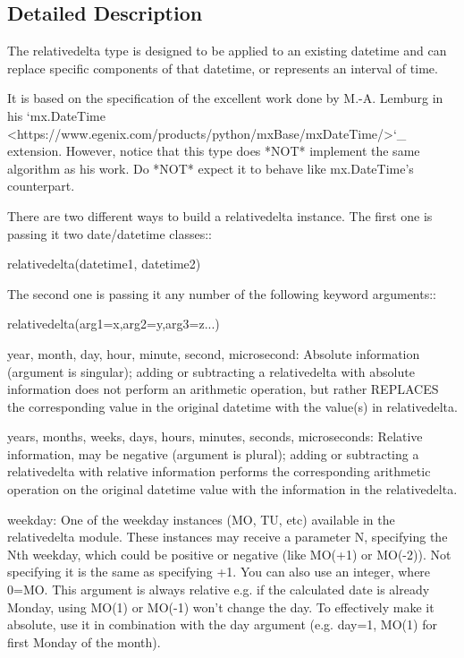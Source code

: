 \subsection{Detailed Description}
\begin{DoxyVerb}The relativedelta type is designed to be applied to an existing datetime and
can replace specific components of that datetime, or represents an interval
of time.

It is based on the specification of the excellent work done by M.-A. Lemburg
in his
`mx.DateTime <https://www.egenix.com/products/python/mxBase/mxDateTime/>`_ extension.
However, notice that this type does *NOT* implement the same algorithm as
his work. Do *NOT* expect it to behave like mx.DateTime's counterpart.

There are two different ways to build a relativedelta instance. The
first one is passing it two date/datetime classes::

    relativedelta(datetime1, datetime2)

The second one is passing it any number of the following keyword arguments::

    relativedelta(arg1=x,arg2=y,arg3=z...)

    year, month, day, hour, minute, second, microsecond:
        Absolute information (argument is singular); adding or subtracting a
        relativedelta with absolute information does not perform an arithmetic
        operation, but rather REPLACES the corresponding value in the
        original datetime with the value(s) in relativedelta.

    years, months, weeks, days, hours, minutes, seconds, microseconds:
        Relative information, may be negative (argument is plural); adding
        or subtracting a relativedelta with relative information performs
        the corresponding arithmetic operation on the original datetime value
        with the information in the relativedelta.

    weekday: 
        One of the weekday instances (MO, TU, etc) available in the
        relativedelta module. These instances may receive a parameter N,
        specifying the Nth weekday, which could be positive or negative
        (like MO(+1) or MO(-2)). Not specifying it is the same as specifying
        +1. You can also use an integer, where 0=MO. This argument is always
        relative e.g. if the calculated date is already Monday, using MO(1)
        or MO(-1) won't change the day. To effectively make it absolute, use
        it in combination with the day argument (e.g. day=1, MO(1) for first
        Monday of the month).


\end{DoxyVerb}
